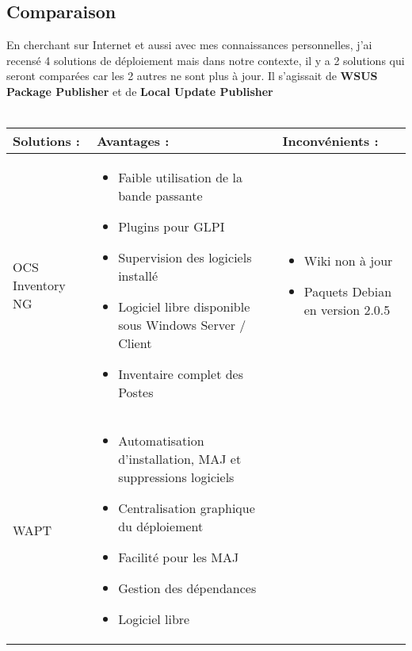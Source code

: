 \documentclass[11pt,a4paper,oneside]{article}
\begin{document}
\subsection{Comparaison}
En cherchant sur Internet et aussi avec mes connaissances personnelles, j'ai recensé 4 solutions de déploiement mais dans notre contexte, il y a 2 solutions qui seront comparées car les 2 autres ne sont plus à jour. Il s'agissait de \textbf{WSUS Package Publisher} et de \textbf{Local Update Publisher} \\ \\
\begin{tabular}{|p{3.1cm}|p{6.5cm}|p{6.5cm}|}
	\hline
	\centering Solutions : & \centering Avantages : & Inconvénients : \\
	\hline
	\centering OCS Inventory NG  & \begin{itemize}
							\item Faible utilisation de la bande passante 
							\item Plugins pour GLPI							
							\item Supervision des logiciels installé
							\item Logiciel libre disponible sous Windows Server / Client
							\item Inventaire complet des Postes							
						\end{itemize} & \begin{itemize}
												\item Wiki non à jour  
												\item Paquets Debian en version 2.0.5																			\end{itemize} \\
	\hline
	\centering WAPT  & \begin{itemize}
							\item Automatisation d'installation, MAJ et suppressions logiciels 
							\item Centralisation graphique du déploiement
							\item Facilité pour les MAJ 
							\item Gestion des dépendances
							\item Logiciel libre													
						\end{itemize} & \begin{itemize}

\end{itemize}
\end{tabular}
\end{document}
